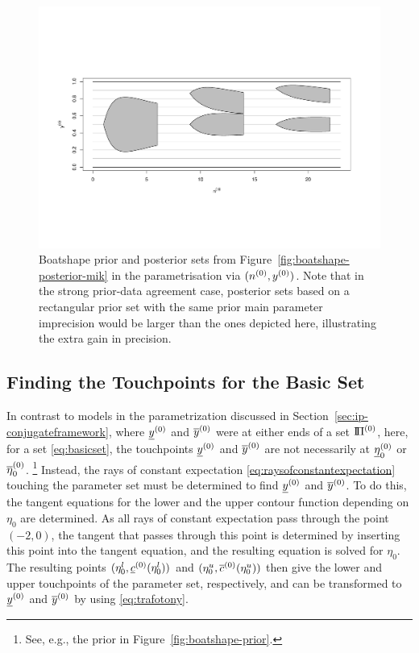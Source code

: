\begin{figure}  %
\centering
\includegraphics[trim = 15mm 45mm 25mm 60mm, clip, width=\textwidth]{R/boatshape-posterior-normal}%
\caption[Boatshape prior and posterior sets from Figure~\ref{fig:boatshape-posterior-mik} in the parametrisation via $(\nz,\yz)$.]%
{Boatshape prior and posterior sets from Figure~\ref{fig:boatshape-posterior-mik} in the parametrisation via $(\nz,\yz)$.
Note that in the strong prior-data agreement case,
posterior sets based on a rectangular prior set with the same prior main parameter imprecision
would be larger than the ones depicted here, illustrating the extra gain in precision.}
\label{fig:boatshape-posterior-normal}
\end{figure}


\subsection{Finding the Touchpoints for the Basic Set}
\label{sec:touchpoints}

In contrast to models in the parametrization discussed in Section~\ref{sec:ip-conjugateframework},
where $\underline{y}^{(0)}$ and $\overline{y}^{(0)}$ were at either ends of a set $\text{I}\!\Pi^{(0)}$,
here, for a set \eqref{eq:basicset}, the touchpoints $\underline{y}^{(0)}$ and $\overline{y}^{(0)}$ 
are not necessarily at $\underline{\eta}_0^{(0)}$ or $\overline{\eta}_0^{(0)}$.%
\footnote{See, e.g., the prior in Figure~\ref{fig:boatshape-prior}.}
Instead, the rays of constant expectation \eqref{eq:raysofconstantexpectation}
touching the parameter set must be determined to find $\underline{y}^{(0)}$ and $\overline{y}^{(0)}$.
To do this, the tangent equations for the lower and the upper contour function
depending on $\eta_0$ are determined.
As all rays of constant expectation pass through the point $(-2,0)$,
the tangent that passes through this point is determined by inserting this point
into the tangent equation, and the resulting equation is solved for $\eta_0$.
The resulting points $(\eta_0^l,\underline{c}^{(0)}(\eta_0^l))$ and $(\eta_0^u,\overline{c}^{(0)}(\eta_0^u))$
then give the lower and upper touchpoints of the parameter set, respectively,
and can be transformed to $\underline{y}^{(0)}$ and $\overline{y}^{(0)}$ by using \eqref{eq:trafotony}.

